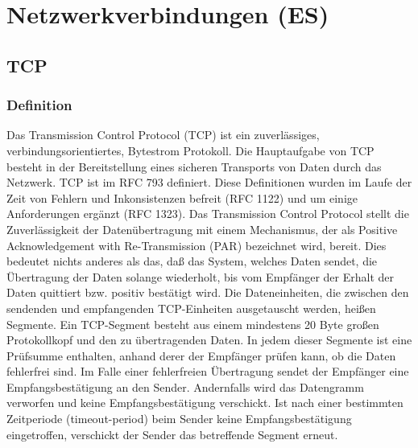 \newcommand\tab[1][1cm]{\hspace*{#1}}
\section{Netzwerkverbindungen (ES)}
\subsection{TCP}
\subsubsection{Definition}
Das Transmission Control Protocol (TCP) ist ein zuverlässiges, verbindungsorientiertes, Bytestrom Protokoll. Die Hauptaufgabe von TCP besteht in der Bereitstellung eines sicheren Transports von Daten durch das Netzwerk. TCP ist im RFC 793 definiert. Diese Definitionen wurden im Laufe der Zeit von Fehlern und Inkonsistenzen befreit (RFC 1122) und um einige Anforderungen ergänzt (RFC 1323). Das Transmission Control Protocol stellt die Zuverlässigkeit der Datenübertragung mit einem Mechanismus, der als Positive Acknowledgement with Re-Transmission (PAR) bezeichnet wird, bereit. Dies bedeutet nichts anderes als das, daß das System, welches Daten sendet, die Übertragung der Daten solange wiederholt, bis vom Empfänger der Erhalt der Daten quittiert bzw. positiv bestätigt wird. Die Dateneinheiten, die zwischen den sendenden und empfangenden TCP-Einheiten ausgetauscht werden, heißen Segmente. Ein TCP-Segment besteht aus einem mindestens 20 Byte großen Protokollkopf und den zu übertragenden Daten. In jedem dieser Segmente ist eine Prüfsumme enthalten, anhand derer der Empfänger prüfen kann, ob die Daten fehlerfrei sind. Im Falle einer fehlerfreien Übertragung sendet der Empfänger eine Empfangsbestätigung an den Sender. Andernfalls wird das Datengramm verworfen und keine Empfangsbestätigung verschickt. Ist nach einer bestimmten Zeitperiode (timeout-period) beim Sender keine Empfangsbestätigung eingetroffen, verschickt der Sender das betreffende Segment erneut. 
